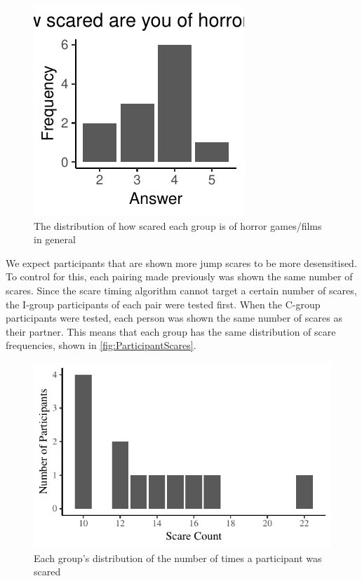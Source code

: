 \documentclass[12pt,a4paper]{article}\usepackage[]{graphicx}\usepackage[]{color}
\makeatletter
\def\maxwidth{ %
  \ifdim\Gin@nat@width>\linewidth
    \linewidth
  \else
    \Gin@nat@width
  \fi
}
\makeatother
\begin{document}
\begin{figure}[htb]


{\centering \includegraphics[width=\maxwidth]{figure/ParticipantScaredness-1} 

}



\caption{The distribution of how scared each group is of horror games/films in general}
\label{fig:ParticipantScaredness}
\end{figure}

We expect participants that are shown more jump scares to be more desensitised.
To control for this, each pairing made previously was shown the same number of scares.
Since the scare timing algorithm cannot target a certain number of scares, the I-group participants of each pair were tested first.
When the C-group participants were tested, each person was shown the same number of scares as their partner.
This means that each group has the same distribution of scare frequencies, shown in \vref{fig:ParticipantScares}.

\begin{figure}[htb]


{\centering \includegraphics[width=\maxwidth]{figure/ParticipantScares-1} 

}



\caption{Each group's distribution of the number of times a participant was scared}
\label{fig:ParticipantScares}
\end{figure}
\end{document}
